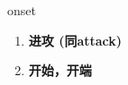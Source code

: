 
\begin{frame}
{\huge onset}
\begin{center}
\begin{enumerate}\Large
  \item \textbf{进攻 (同attack)}
  \item \textbf{开始，开端}
\end{enumerate}
\end{center}
\end{frame}
